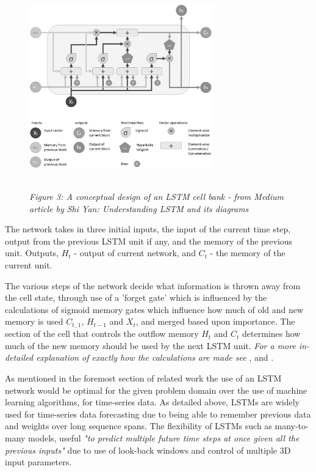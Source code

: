 \documentclass[oneside, 12pt]{article}
\begin{document}
			\begin{figure}[hbt!]
				\centering
				\includegraphics[width=8cm,height=8cm]{images/lstm.png}
				\begin{center}
					\textit{Figure 3: A conceptual design of an LSTM cell bank - from Medium article by Shi Yan: Understanding LSTM and its diagrams}\cite{LSTMdia}
				\end{center}
			\end{figure}
			
			The network takes in three initial inputs, the input of the current time step, output from the previous LSTM unit if any, and the memory of the previous unit. Outputs, $H_t$ - output of current network, and $C_t$ - the memory of the current unit. \cite{LSTMdia}
			
			The various steps of the network decide what information is thrown away from the cell state, through use of a 'forget gate' which is influenced by the calculations of sigmoid memory gates which influence how much of old and new memory is used $C_{t_-1}$, $H_{t-1}$
			and $X_t$, and merged based upon importance. The section of the cell that controls the outflow memory $H_t$ and $C_t$ determines how much of the new memory should be used by the next LSTM unit. 
			\textit{For a more in-detailed explanation of exactly how the calculations are made see} \cite{LSTM},\cite{LSTMdia} and \cite{LSTMmaths}.
			
			As mentioned in the foremost section of related work the use of an LSTM network would be optimal for the given problem domain over the use of machine learning algorithms, for time-series data. As detailed above, LSTMs are widely used for time-series data forecasting due to being able to remember previous data and weights over long sequence spans\cite{LSTM}\cite{LSTMforetime}. The flexibility of LSTMs such as many-to-many models, useful \textit{"to predict multiple future time steps at once given all the previous inputs"} due to use of look-back windows and control of multiple 3D input parameters.\cite{LSTMforetime}
			
\end{document}

